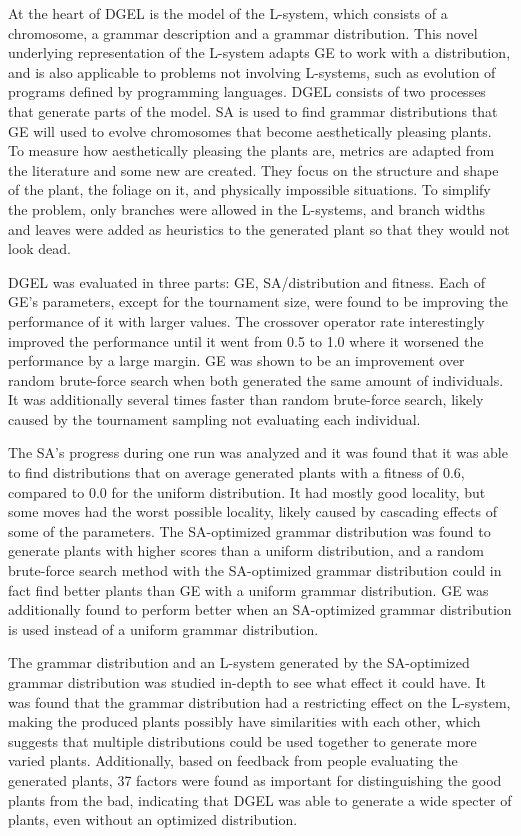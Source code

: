 At the heart of \gls{DGEL} is the model of the \gls{L-system}, which consists of a chromosome, a grammar description and a grammar distribution.
This novel underlying representation of the \gls{L-system} adapts \gls{GE} to work with a distribution, and is also applicable to problems not involving \glspl{L-system}, such as evolution of programs defined by programming languages.
\gls{DGEL} consists of two processes that generate parts of the model.
\gls{SA} is used to find grammar distributions that \gls{GE} will used to evolve chromosomes that become aesthetically pleasing plants.
To measure how aesthetically pleasing the plants are, metrics are adapted from the literature and some new are created.
They focus on the structure and shape of the plant, the foliage on it, and physically impossible situations.
To simplify the problem, only branches were allowed in the \glspl{L-system}, and branch widths and leaves were added as heuristics to the generated plant so that they would not look dead.

\gls{DGEL} was evaluated in three parts: \gls{GE}, \gls{SA}/distribution and fitness.
Each of \gls{GE}'s parameters, except for the tournament size, were found to be improving the performance of it with larger values.
The crossover operator rate interestingly improved the performance until it went from 0.5 to 1.0 where it worsened the performance by a large margin.
\gls{GE} was shown to be an improvement over random brute-force search when both generated the same amount of individuals.
It was additionally several times faster than random brute-force search, likely caused by the tournament sampling not evaluating each individual.

The \gls{SA}'s progress during one run was analyzed and it was found that it was able to find distributions that on average generated plants with a fitness of 0.6, compared to 0.0 for the uniform distribution.
It had mostly good locality, but some moves had the worst possible locality, likely caused by cascading effects of some of the parameters.
The \gls{SA}-optimized grammar distribution was found to generate plants with higher scores than a uniform distribution, and a random brute-force search method with the \gls{SA}-optimized grammar distribution could in fact find better plants than \gls{GE} with a uniform grammar distribution.
\gls{GE} was additionally found to perform better when an \gls{SA}-optimized grammar distribution is used instead of a uniform grammar distribution.

The grammar distribution and an \gls{L-system} generated by the \gls{SA}-optimized grammar distribution was studied in-depth to see what effect it could have.
It was found that the grammar distribution had a restricting effect on the \gls{L-system}, making the produced plants possibly have similarities with each other, which suggests that multiple distributions could be used together to generate more varied plants.
Additionally, based on feedback from people evaluating the generated plants, 37 factors were found as important for distinguishing the good plants from the bad, indicating that \gls{DGEL} was able to generate a wide specter of plants, even without an optimized distribution.


